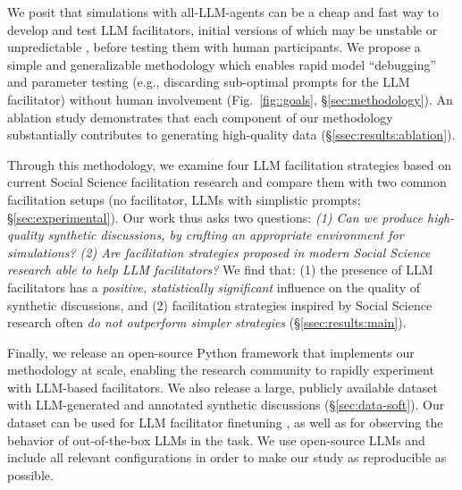 We posit that simulations with all-LLM-agents can be a cheap and fast way to develop and test  LLM facilitators, initial versions of which may be unstable or unpredictable \cite{atil_2025, rossi_2024}, before testing them with human participants. We propose a simple and generalizable methodology which enables rapid model “debugging” and parameter testing (e.g., discarding sub-optimal  prompts for the LLM facilitator) without human involvement (Fig.~\ref{fig::goals}, \S\ref{sec:methodology}). An ablation study demonstrates that each component of our methodology substantially contributes to generating high-quality data (\S\ref{ssec:results:ablation}). 

Through this methodology, we examine  four LLM facilitation strategies based on current Social Science facilitation research and compare them with two common facilitation setups (no facilitator, LLMs with simplistic prompts; \S\ref{sec:experimental}). Our work thus asks two questions: \emph{(1) Can we produce high-quality synthetic discussions, by crafting an appropriate environment for simulations? (2) Are facilitation strategies proposed in modern Social Science research able to help LLM facilitators?} We find that: (1) the presence of LLM facilitators has a \emph{positive, statistically significant} influence on the quality of synthetic discussions, and (2) facilitation strategies inspired by Social Science research often \emph{do not outperform simpler strategies} (\S\ref{ssec:results:main}).

Finally, we release an open-source Python framework that implements our methodology at scale, enabling the research community to rapidly experiment with LLM-based facilitators. We also release \vmd a large, publicly available dataset with LLM-generated and annotated synthetic discussions (\S\ref{sec:data-soft}). Our dataset can be used for LLM facilitator finetuning \cite{ulmer2024}, as well as for observing the behavior of out-of-the-box LLMs in the task. We use open-source LLMs and include all relevant configurations in order to make our study as reproducible as possible.
